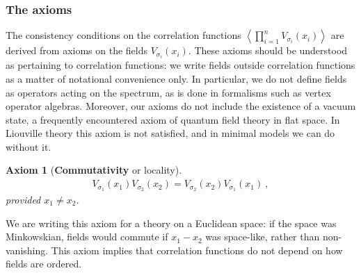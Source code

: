 \documentclass[12pt, a4paper, notitlepage, twoside]{report}
\numberwithin{equation}{section}
\theoremstyle{break}
\newtheorem{hyp}{Axiom}[chapter]
\begin{document}
\subsubsection{The axioms}

The consistency conditions on the correlation functions $\left\langle\prod_{i=1}^n V_{\sigma_i}(x_i)\right\rangle$ are derived from axioms on the fields $V_{\sigma_i}(x_i)$. These axioms should be understood as pertaining to correlation functions: we write fields outside correlation functions as a matter of notational convenience only. In particular, we do not define fields as operators acting on the spectrum, as is done in formalisms such as vertex operator algebras. 
Moreover, our axioms do not include the existence of a vacuum state, a frequently encountered axiom of quantum field theory in flat space.
In Liouville theory this axiom is not satisfied, and in minimal models we can do without it. 

\begin{hyp}[\textbf{Commutativity} or locality]
\label{ax:col}
\begin{align}
 \boxed{V_{\sigma_1}(x_1)V_{\sigma_2}(x_2) = V_{\sigma_2}(x_2) V_{\sigma_1}(x_1)}\ ,
\label{comm}
\end{align}
provided $x_1\neq x_2$. 
\end{hyp}
\noindent
We are writing this axiom for a theory on a Euclidean space: if the space was Minkowskian, fields would commute if $x_1-x_2$ was space-like, rather than non-vanishing. 
This axiom implies that correlation functions do not depend on how fields are ordered.
\end{document}

